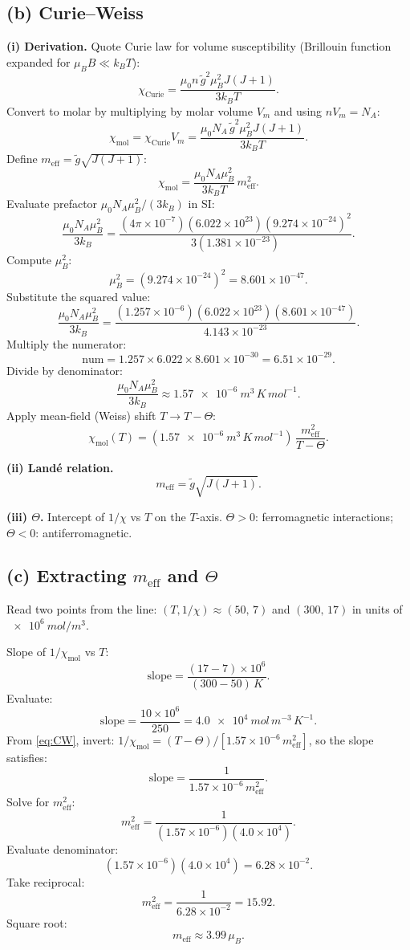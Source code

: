 \documentclass[11pt]{article}
\begin{document}
\subsection*{(b) Curie--Weiss}

\textbf{(i) Derivation.} Quote Curie law for volume susceptibility (Brillouin function expanded for $\mu_B B\ll k_B T$):
\[ \chi_{\text{Curie}}=\frac{\mu_0 n\,\tilde g^2\mu_B^2 J(J+1)}{3 k_B T}. \]
Convert to molar by multiplying by molar volume $V_m$ and using $n V_m=N_A$:
\[ \chi_{\text{mol}}=\chi_{\text{Curie}}V_m=\frac{\mu_0 N_A\,\tilde g^2\mu_B^2 J(J+1)}{3k_B T}. \]
Define $m_{\text{eff}}=\tilde g\sqrt{J(J+1)}$:
\[ \chi_{\text{mol}}=\frac{\mu_0 N_A\mu_B^2}{3k_B T}\,m_{\text{eff}}^2. \]
Evaluate prefactor $\mu_0 N_A\mu_B^2/(3k_B)$ in SI:
\[ \frac{\mu_0 N_A\mu_B^2}{3k_B}=\frac{(4\pi\times 10^{-7})(6.022\times 10^{23})(9.274\times 10^{-24})^2}{3(1.381\times 10^{-23})}. \]
Compute $\mu_B^2$:
\[ \mu_B^2=(9.274\times 10^{-24})^2=8.601\times 10^{-47}. \]
Substitute the squared value:
\[ \frac{\mu_0 N_A\mu_B^2}{3k_B}=\frac{(1.257\times 10^{-6})(6.022\times 10^{23})(8.601\times 10^{-47})}{4.143\times 10^{-23}}. \]
Multiply the numerator:
\[ \text{num}=1.257\times 6.022\times 8.601\times 10^{-30}=6.51\times 10^{-29}. \]
Divide by denominator:
\[ \frac{\mu_0 N_A\mu_B^2}{3k_B}\approx \SI{1.57e-6}{m^3\,K\,mol^{-1}}. \]
Apply mean-field (Weiss) shift $T\to T-\Theta$:
\begin{equation}
\boxed{\;\chi_{\text{mol}}(T)=(\SI{1.57e-6}{m^3\,K\,mol^{-1}})\,\frac{m_{\text{eff}}^2}{T-\Theta}.\;}
\label{eq:CW}
\end{equation}

\textbf{(ii) Land\'e relation.}
\[ \boxed{\;m_{\text{eff}}=\tilde g\sqrt{J(J+1)}.\;} \]

\textbf{(iii) $\Theta$.} Intercept of $1/\chi$ vs $T$ on the $T$-axis. $\Theta>0$: ferromagnetic interactions; $\Theta<0$: antiferromagnetic.

\subsection*{(c) Extracting $m_{\text{eff}}$ and $\Theta$}

Read two points from the line: $(T,1/\chi)\approx(50,\,7)$ and $(300,\,17)$ in units of $\SI{e6}{mol/m^3}$.

Slope of $1/\chi_{\text{mol}}$ vs $T$:
\[ \text{slope}=\frac{(17-7)\times 10^6}{(300-50)\,\si{K}}. \]
Evaluate:
\[ \text{slope}=\frac{10\times 10^6}{250}=\SI{4.0e4}{mol\,m^{-3}\,K^{-1}}. \]
From \eqref{eq:CW}, invert: $1/\chi_{\text{mol}}=(T-\Theta)/[1.57\times 10^{-6}\,m_{\text{eff}}^2]$, so the slope satisfies:
\[ \text{slope}=\frac{1}{1.57\times 10^{-6}\,m_{\text{eff}}^2}. \]
Solve for $m_{\text{eff}}^2$:
\[ m_{\text{eff}}^2=\frac{1}{(1.57\times 10^{-6})(4.0\times 10^{4})}. \]
Evaluate denominator:
\[ (1.57\times 10^{-6})(4.0\times 10^{4})=6.28\times 10^{-2}. \]
Take reciprocal:
\[ m_{\text{eff}}^2=\frac{1}{6.28\times 10^{-2}}=15.92. \]
Square root:
\[ \boxed{\;m_{\text{eff}}\approx 3.99\,\mu_B.\;} \]
\end{document}
